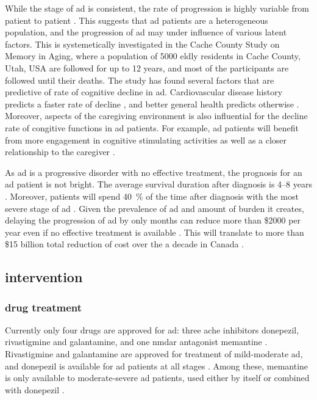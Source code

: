 While the stage of \gls{ad} is consistent, the rate of progression is highly variable from patient to patient \citep{komarova11, tschanz11}. This suggests that \gls{ad} patients are a heterogeneous population, and the progression of \gls{ad} may under influence of various latent factors. This is systemetically investigated in the Cache County Study on Memory in Aging, where a population of \num{5000} eldly residents in Cache County, Utah, USA are followed for up to \num{12} years, and most of the participants are followed until their deaths. The study has found several factors that are predictive of rate of cognitive decline in \gls{ad}. Cardiovascular disease history predicts a faster rate of decline \citep{mielke07}, and better general health predicts otherwise \citep{leoutsakos12}. Moreover, aspects of the caregiving environment is also influential for the decline rate of congitive functions in \gls{ad} patients. For example, \gls{ad} patients will benefit from more engagement in cognitive stimulating activities \citep{treiber11} as well as a closer relationship to the caregiver \citep{norton09}.

As \gls{ad} is a progressive disorder with no effective treatment, the prognosis for an \gls{ad} patient is not bright. The average survival duration after diagnosis is 4--8 years \citep{larson04, helzner08}. Moreover, patients will spend \SI{40}{\percent} of the time after diagnosis with the most severe stage of \gls{ad} \citep{arrighi10}. Given the prevalence of \gls{ad} and amount of burden it creates, delaying the progression of \gls{ad} by only months can reduce more than \$\num{2000} per year even if no effective treatment is available \citep{zhu06}. This will translate to more than \$15 billion total reduction of cost over the a decade in Canada \citep{adc10}.

\subsection{intervention}
\subsubsection{drug treatment}
Currently only four drugs are approved for \gls{ad}: three \gls{ache} inhibitors donepezil, rivastigmine and galantamine, and one \gls{nmdar} antagonist memantine \citep{nelson15}. Rivastigmine and galantamine are approved for treatment of mild-moderate \gls{ad}, and donepezil is available for \gls{ad} patients at all stages \citep{bassil09, smith09}. Among these, memantine is only available to moderate-severe \gls{ad} patients, used either by itself or combined with donepezil \citep{nelson15}.

